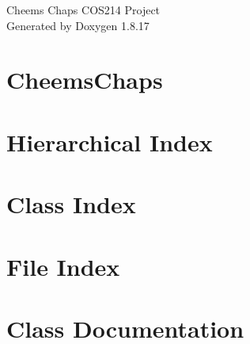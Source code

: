 \let\mypdfximage\pdfximage\def\pdfximage{\immediate\mypdfximage}\documentclass[twoside]{book}
\newcommand{\+}{\discretionary{\mbox{\scriptsize$\hookleftarrow$}}{}{}}
\newcommand{\clearemptydoublepage}{%
  \newpage{\pagestyle{empty}\cleardoublepage}%
}
\begin{document}
\hypersetup{pageanchor=false,
             bookmarksnumbered=true,
             pdfencoding=unicode
            }
\begin{titlepage}
\vspace*{7cm}
\begin{center}%
{\Large Cheems Chaps C\+O\+S214 Project }\\
\vspace*{1cm}
{\large Generated by Doxygen 1.8.17}\\
\end{center}
\end{titlepage}
\clearemptydoublepage
{}
\tableofcontents
\clearemptydoublepage
{}
\hypersetup{pageanchor=true}

\chapter{Cheems\+Chaps}
\label{md_README}

\chapter{Hierarchical Index}

\chapter{Class Index}

\chapter{File Index}

\chapter{Class Documentation}









































\end{document}
